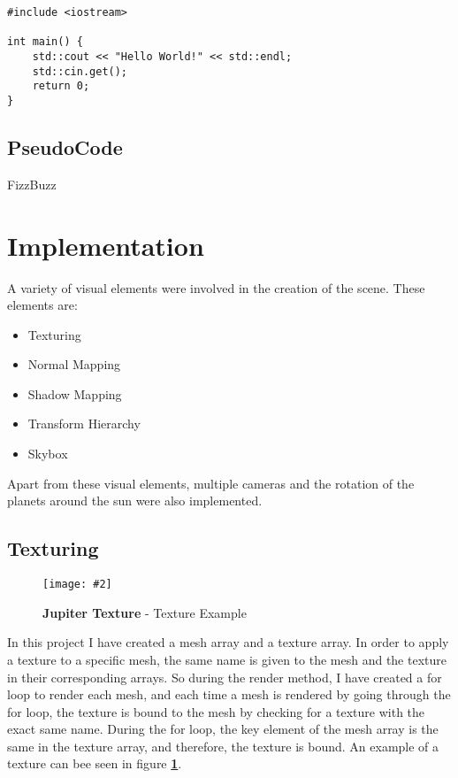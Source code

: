 \documentclass[10pt, a4paper]{article}
\newcommand{\figuremacro}[5]{
    \begin{figure}[#1]
        \centering
        \texttt{[image: \#2]}
        \caption[#3]{\textbf{#3}#4}
        \label{fig:#2}
    \end{figure}
}
\begin{document}
\begin{lstlisting}[caption = Hello World! in c++]
#include <iostream>

int main() {
    std::cout << "Hello World!" << std::endl;
    std::cin.get();
    return 0;
}
\end{lstlisting}


    
\subsection{PseudoCode}

\begin{algorithm}[h]
\caption{FizzBuzz}
\end{algorithm}

	\fi
	
	

	
	
\section{Implementation}
	A variety of visual elements were involved in the creation of the scene. These elements are:
	\begin{itemize}
		\item Texturing
		\item Normal Mapping
		\item Shadow Mapping
		\item Transform Hierarchy
		\item Skybox
	\end{itemize}
	Apart from these visual elements, multiple cameras and the rotation of the planets around the sun were also implemented.
\newpage
\subsection{Texturing}

	\figuremacro{H}{Jupiter}{Jupiter Texture}{ - Texture Example}{1.0}

	In this project I have created a mesh array and a texture array. In order to apply a texture to a specific mesh, the same name is given to the mesh and the texture in their corresponding arrays. So during the render method, I have created a for loop to render each mesh, and each time a mesh is rendered by going through the for loop, the texture is bound to the mesh by checking for a texture with the exact same name. During the for loop, the key element of the mesh array is the same in the texture array, and therefore, the texture is bound. An example of a texture can bee seen in figure \textbf{\ref{fig:Jupiter}}.
\end{document}
